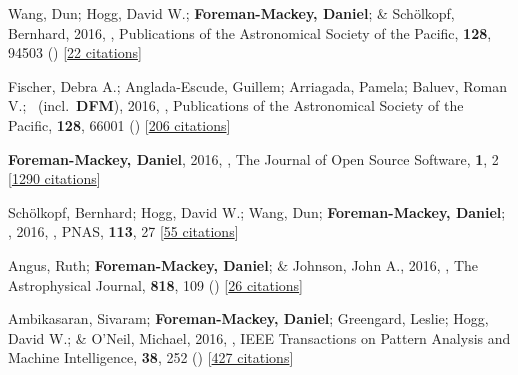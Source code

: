 \item[{\color{numcolor}\scriptsize19}] Wang, Dun; Hogg, David W.; \textbf{Foreman-Mackey, Daniel}; \& Sch{\"o}lkopf, Bernhard, 2016, , Publications of the Astronomical Society of the Pacific, \textbf{128}, 94503 () [\href{https://ui.adsabs.harvard.edu/abs/2016PASP..128i4503W}{22 citations}]

\item[{\color{numcolor}\scriptsize18}] Fischer, Debra A.; Anglada-Escude, Guillem; Arriagada, Pamela; Baluev, Roman V.; \etal\ (incl.\ \textbf{DFM}), 2016, , Publications of the Astronomical Society of the Pacific, \textbf{128}, 66001 () [\href{https://ui.adsabs.harvard.edu/abs/2016PASP..128f6001F}{206 citations}]

\item[{\color{numcolor}\scriptsize17}] \textbf{Foreman-Mackey, Daniel}, 2016, , The Journal of Open Source Software, \textbf{1}, 2 [\href{https://scholar.google.com/scholar?cites=1835087844145558435,17325274697099535179,14220488595059618709,12820425635803494730,7284810048757141243,17415935839493019063}{1290 citations}]

\item[{\color{numcolor}\scriptsize16}] Sch{\"o}lkopf, Bernhard; Hogg, David W.; Wang, Dun; \textbf{Foreman-Mackey, Daniel}; \etal, 2016, , PNAS, \textbf{113}, 27 [\href{https://scholar.google.com/scholar?cites=2429561747341807338}{55 citations}]

\item[{\color{numcolor}\scriptsize15}] Angus, Ruth; \textbf{Foreman-Mackey, Daniel}; \& Johnson, John A., 2016, , The Astrophysical Journal, \textbf{818}, 109 () [\href{https://ui.adsabs.harvard.edu/abs/2016ApJ...818..109A}{26 citations}]

\item[{\color{numcolor}\scriptsize14}] Ambikasaran, Sivaram; \textbf{Foreman-Mackey, Daniel}; Greengard, Leslie; Hogg, David W.; \& O'Neil, Michael, 2016, , IEEE Transactions on Pattern Analysis and Machine Intelligence, \textbf{38}, 252 () [\href{https://scholar.google.com/scholar?cites=4840899390891567426,9641158393712381489}{427 citations}]

